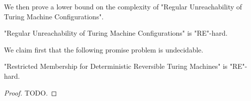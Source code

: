 We then prove a lower bound on the complexity of "Regular Unreachability of Turing Machine Configurations".

\begin{lemma}
	\AP\label{lemma:regular-unreachability-lowerbound}
  	"Regular Unreachability of Turing Machine Configurations" is
	"RE"-hard.
\end{lemma}

We claim first that the following promise problem is undecidable.

\begin{lemma}
	\AP\label{lemma:restricted-membership-detrevTM-lowerbound}
	"Restricted Membership for Deterministic Reversible Turing Machines" is
	"RE"-hard.
\end{lemma}

\begin{proof}
	TODO.
\end{proof}

